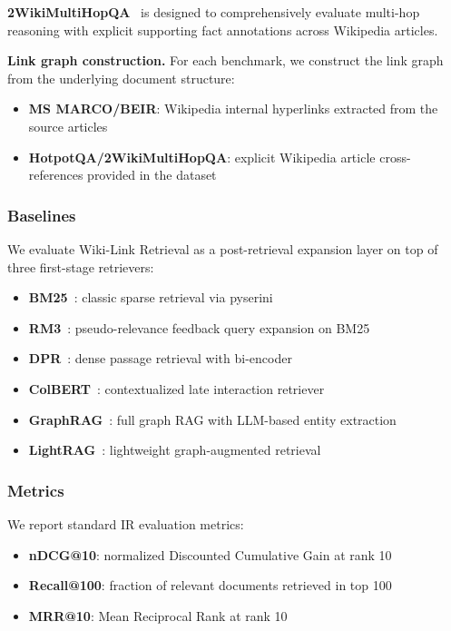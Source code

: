 \documentclass[sigconf,review]{acmart}
\newcommand{\sys}{Wiki-Link Retrieval\xspace}
\begin{document}
\textbf{2WikiMultiHopQA}~\citep{ho2020twikimultihop} is designed to comprehensively evaluate multi-hop
reasoning with explicit supporting fact annotations across Wikipedia articles.

\textbf{Link graph construction.} For each benchmark, we construct the link graph
from the underlying document structure:
\begin{itemize}
  \item \textbf{MS MARCO/BEIR}: Wikipedia internal hyperlinks extracted from the source articles
  \item \textbf{HotpotQA/2WikiMultiHopQA}: explicit Wikipedia article cross-references provided in the dataset
\end{itemize}

\subsubsection{Baselines}

We evaluate \sys as a post-retrieval expansion layer on top of three
first-stage retrievers:

\begin{itemize}
  \item \textbf{BM25}~\citep{robertson1994bm25}: classic sparse retrieval via pyserini
  \item \textbf{RM3}~\citep{rm3_2004}: pseudo-relevance feedback query expansion on BM25
  \item \textbf{DPR}~\citep{karpukhin2020dpr}: dense passage retrieval with bi-encoder
  \item \textbf{ColBERT}~\citep{khattab2020colbert}: contextualized late interaction retriever
  \item \textbf{GraphRAG}~\citep{graphrag2024}: full graph RAG with LLM-based entity extraction
  \item \textbf{LightRAG}~\citep{lighthrag}: lightweight graph-augmented retrieval
\end{itemize}

\subsubsection{Metrics}

We report standard IR evaluation metrics:
\begin{itemize}
  \item \textbf{nDCG@10}: normalized Discounted Cumulative Gain at rank 10
  \item \textbf{Recall@100}: fraction of relevant documents retrieved in top 100
  \item \textbf{MRR@10}: Mean Reciprocal Rank at rank 10
\end{itemize}
\end{document}
